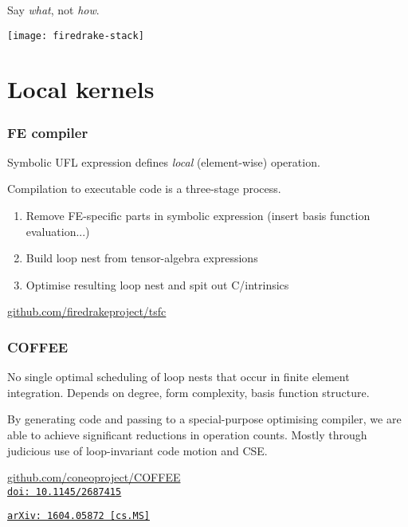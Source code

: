 \documentclass[presentation]{beamer}
\newcommand{\arxivlink}[2]{%
  \href{http://www.arxiv.org/abs/#1}%
  {{\small\texttt{arXiv:\,#1\,[#2]}}}%
}
\newcommand{\doilink}[1]{%
  \href{http://dx.doi.org/#1}%
  {{\small\texttt{doi:\,#1}{}}}%
}
\begin{document}
\begin{frame}[standout]
  Say \emph{what}, not \emph{how}.
\end{frame}

\begin{frame}
  \texttt{[image: firedrake-stack]}
\end{frame}

\section{Local kernels}

\begin{frame}
  \frametitle{FE compiler}
  Symbolic UFL expression defines \emph{local} (element-wise)
  operation.

  Compilation to executable code is a three-stage process.
  \begin{enumerate}
  \item Remove FE-specific parts in symbolic expression (insert basis
    function evaluation...)
  \item Build loop nest from tensor-algebra expressions
  \item Optimise resulting loop nest and spit out C/intrinsics
  \end{enumerate}
  \begin{center}
    \url{github.com/firedrakeproject/tsfc}
  \end{center}
\end{frame}

\begin{frame}[fragile]
  \frametitle{COFFEE}
  
  No single optimal scheduling of loop nests that occur in finite
  element integration.  Depends on degree, form complexity, basis
  function structure.

  By generating code and passing to a special-purpose optimising
  compiler, we are able to achieve significant reductions in operation
  counts.  Mostly through judicious use of loop-invariant code motion
  and CSE.

  

  \begin{center}
    \url{github.com/coneoproject/COFFEE}\\
    \cite{Luporini:2015} \doilink{10.1145/2687415}
    \cite{Luporini:2016} \arxivlink{1604.05872}{cs.MS}\\
  \end{center}
\end{frame}
\end{document}
